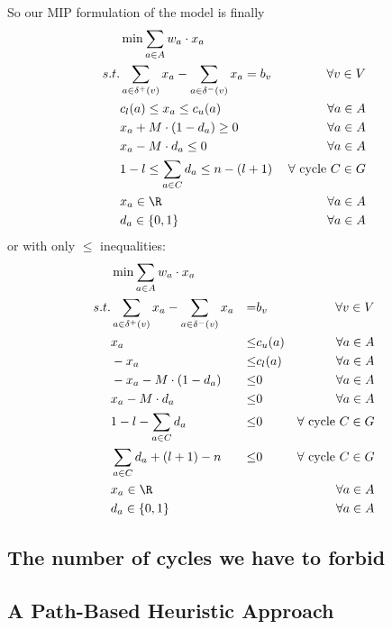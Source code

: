 So our MIP formulation of the model is finally
\begin{align*}
 &\min \sum_{a\in A} w_a\cdot x_a & \\
 s.t. & \sum_{a\in \delta^+(v)}x_a - \sum_{a\in\delta^- (v)}x_a = b_v\ &\forall v\in V \\
  & c_l(a)\le x_a \le c_u(a) & \forall a\in A\\
 &x_a + M\cdot (1-d_a) \ge 0 & \forall a\in A\\
 &x_a - M\cdot d_a \le 0 & \forall a\in A\\
 &1-l \le \sum_{a\in C}d_a \le n-(l+1) & \forall \textrm{ cycle }C\in G\\
 & x_a \in \R &\forall a\in A\\
 & d_a \in \{0,1\} &\forall a\in A
\end{align*}
or with only $\le$ inequalities:
\begin{align}
 &\min \sum_{a\in A} w_a\cdot x_a & \\
 s.t. & \sum_{a\in \delta^+(v)}x_a - \sum_{a\in\delta^- (v)}x_a &=& b_v\ &\forall v\in V \\
 & x_a &\le& c_u(a) & \forall a\in A\\
 & -x_a &\le& c_l(a) & \forall a\in A\\
 &-x_a - M\cdot (1-d_a) &\le& 0 & \forall a\in A\\
 &x_a - M\cdot d_a &\le& 0 & \forall a\in A\\
 &1-l - \sum_{a\in C}d_a &\le& 0 & \forall \textrm{ cycle }C\in G\\
 & \sum_{a\in C}d_a +(l+1)-n &\le& 0 & \forall \textrm{ cycle }C\in G\\
 & x_a \in \R & & &\forall a\in A\\
 & d_a \in \{0,1\} & & &\forall a\in A
\end{align}



\subsection{The number of cycles we have to forbid}

\newpage
\subsection{A Path-Based Heuristic Approach}